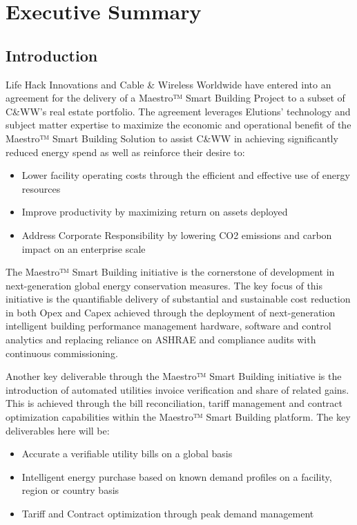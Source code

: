 
\section{Executive Summary}

\subsection{Introduction}

Life Hack Innovations and Cable \& Wireless Worldwide have entered into an agreement for the delivery of a Maestro™ Smart Building Project to a subset of C\&WW’s real estate portfolio. The agreement leverages Elutions’ technology and subject matter expertise to maximize the economic and operational benefit of the Maestro™ Smart Building Solution to assist C\&WW in achieving significantly reduced energy spend as well as reinforce their desire to:
\begin{itemize}
  \item 	Lower facility operating costs through the efficient and effective use of energy resources
  \item 	Improve productivity by maximizing return on assets deployed
  \item 	Address Corporate Responsibility by lowering CO2 emissions and carbon impact on an enterprise scale
\end{itemize}

The Maestro™ Smart Building initiative is the cornerstone of development in next-generation global energy conservation measures. The key focus of this initiative is the quantifiable delivery of substantial and sustainable cost reduction in both Opex and Capex achieved through the deployment of next-generation intelligent building performance management hardware, software and control analytics and replacing reliance on ASHRAE and compliance audits with continuous commissioning.

Another key deliverable through the Maestro™ Smart Building initiative is the introduction of automated utilities invoice verification and share of related gains. This is achieved through the bill reconciliation, tariff management and contract optimization capabilities within the Maestro™ Smart Building platform. The key deliverables here will be:

\begin{itemize}
  \item 	Accurate a verifiable utility bills on a global basis
  \item	Intelligent energy purchase based on known demand profiles on a facility, region or country basis
  \item Tariff and Contract optimization through peak demand management
  \end{itemize}
  
